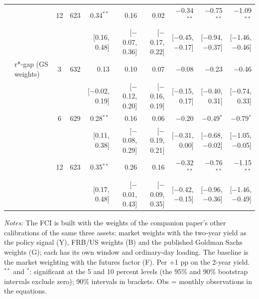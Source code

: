 \begin{longtable}{llcrrrrrrr}
 &  & 12 & 623 & 0.34$^{**}$ & 0.16 & 0.02 & $-$0.34$^{**}$ & $-$0.75$^{**}$ & $-$1.09$^{**}$\\
 & & & & {\scriptsize [0.16, 0.48]} & {\scriptsize [$-$0.07, 0.36]} & {\scriptsize [$-$0.17, 0.22]} & {\scriptsize [$-$0.45, $-$0.17]} & {\scriptsize [$-$0.94, $-$0.37]} & {\scriptsize [$-$1.46, $-$0.46]}\\
 & r*-gap (GS weights) & 3 & 632 & 0.13 & 0.10 & 0.07 & $-$0.08 & $-$0.23 & $-$0.46\\
 & & & & {\scriptsize [$-$0.02, 0.19]} & {\scriptsize [$-$0.12, 0.20]} & {\scriptsize [$-$0.16, 0.19]} & {\scriptsize [$-$0.15, 0.17]} & {\scriptsize [$-$0.40, 0.31]} & {\scriptsize [$-$0.74, 0.33]}\\
 &  & 6 & 629 & 0.28$^{**}$ & 0.16 & 0.06 & $-$0.20 & $-$0.49$^{*}$ & $-$0.79$^{*}$\\
 & & & & {\scriptsize [0.11, 0.38]} & {\scriptsize [$-$0.08, 0.29]} & {\scriptsize [$-$0.19, 0.21]} & {\scriptsize [$-$0.31, 0.00]} & {\scriptsize [$-$0.68, $-$0.02]} & {\scriptsize [$-$1.05, $-$0.05]}\\
 &  & 12 & 623 & 0.35$^{**}$ & 0.26 & 0.16 & $-$0.32$^{**}$ & $-$0.76$^{**}$ & $-$1.15$^{**}$\\
 & & & & {\scriptsize [0.17, 0.48]} & {\scriptsize [$-$0.01, 0.43]} & {\scriptsize [$-$0.09, 0.35]} & {\scriptsize [$-$0.42, $-$0.15]} & {\scriptsize [$-$0.96, $-$0.36]} & {\scriptsize [$-$1.46, $-$0.49]}\\
\end{longtable}
\begin{flushleft}\footnotesize\textit{Notes:} The FCI is built with the weights of the companion paper's other calibrations of the same three assets: market weights with the two-year yield as the policy signal (Y), FRB/US weights (B) and the published Goldman Sachs weights (G); each has its own window and ordinary-day loading. The baseline is the market weighting with the futures factor (F). Per +1 pp on the 2-year yield. $^{**}$ and $^{*}$: significant at the 5 and 10 percent levels (the 95\% and 90\% bootstrap intervals exclude zero); 90\% intervals in brackets. Obs = monthly observations in the equations.\end{flushleft}
\endgroup

